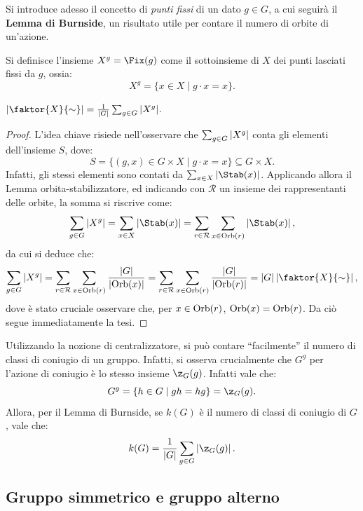 \documentclass[11pt]{scrartcl}
\begin{document}
	Si introduce adesso il concetto di \textit{punti fissi} di un dato $g \in G$, a cui
	seguirà il \textbf{Lemma di Burnside}, un risultato utile per contare il numero
	di orbite di un'azione.
	
	\begin{definition}
		Si definisce l'insieme $X^g = \Fix(g)$ come il sottoinsieme di $X$ dei punti
		lasciati fissi da $g$, ossia:
		\[ X^g = \{ x \in X \mid g \cdot x = x \}. \]
	\end{definition}
	
	\begin{proposition}
		$\abs{\faktor{X}{\sim}} = \frac{1}{\abs{G}} \sum_{g \in G} \abs{X^g}$.
	\end{proposition}
	
	\begin{proof}
		L'idea chiave risiede nell'osservare che $\sum_{g \in G} \left\lvert X^g \right\rvert$ conta
		gli elementi dell'insieme $S$, dove:
		\[ S = \{ (g, x) \in G \times X \mid g \cdot x = x \} \subseteq G \times X. \]
		Infatti, gli stessi elementi sono contati da $\sum_{x \in X} \abs{\Stab(x)}$.
		Applicando allora il Lemma orbita-stabilizzatore, ed indicando
		con $\mathcal{R}$ un insieme dei rappresentanti delle orbite, la
		somma si riscrive come:
		\[ \sum_{g \in G} \abs{X^g} = \sum_{x \in X} \abs{\Stab(x)} =
		\sum_{r \in \mathcal{R}} \sum_{x \in \Orb(r)} \abs{\Stab(x)},
		\]
		da cui si deduce che:
		\[  \sum_{g \in G} \abs{X^g} = \sum_{r \in \mathcal{R}} \sum_{x \in \Orb(r)} \frac{\abs{G}}{\abs{\Orb(x)}} = \sum_{r \in \mathcal{R}} \sum_{x \in \Orb(r)} \frac{\abs{G}}{\abs{\Orb(r)}} = \abs{G} \abs{\faktor{X}{\sim}}, \]
		dove è stato cruciale osservare che, per $x \in \operatorname{Orb}(r)$, $\operatorname{Orb}(x) = \operatorname{Orb}(r)$.
		Da ciò segue immediatamente la tesi.
	\end{proof}
	
		Utilizzando la nozione di centralizzatore, si può contare ``facilmente'' il numero
		di classi di coniugio di un gruppo. Infatti, si osserva crucialmente che
		$G^g$ per l'azione di coniugio
		è lo stesso insieme $\z_G(g)$. Infatti vale che:
		\[ G^g = \{ h \in G \mid gh = hg \} = \z_G(g). \]
		Allora, per il Lemma di Burnside, se $k(G)$ è il numero di classi di coniugio di $G$, vale che:
		\[ k(G) = \frac{1}{\abs{G}} \sum_{g \in G} \abs{\z_G(g)}. \]
	
	\newpage
	
	\subsection{Gruppo simmetrico e gruppo alterno}
	
\end{document}
